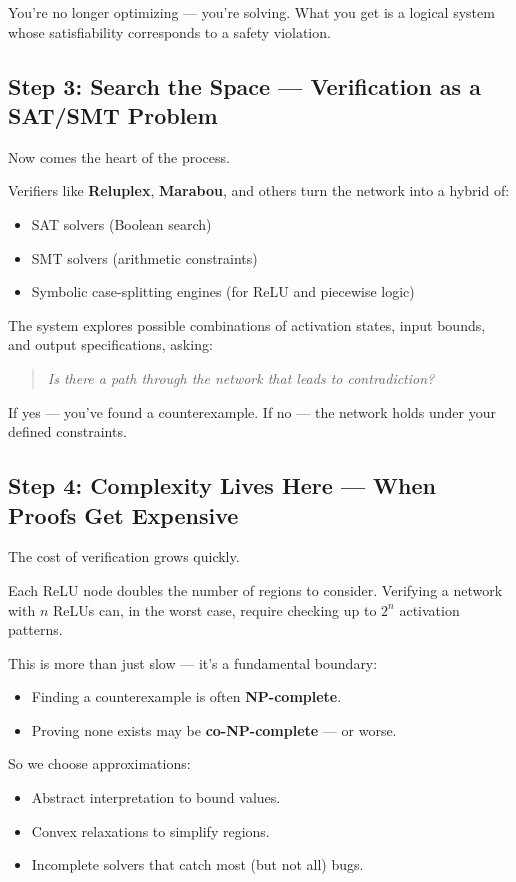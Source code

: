 You’re no longer optimizing — you’re solving.  
What you get is a logical system whose satisfiability corresponds to a safety violation.

\subsection{Step 3: Search the Space — Verification as a SAT/SMT Problem}

Now comes the heart of the process.

Verifiers like \textbf{Reluplex}, \textbf{Marabou}, and others turn the network into a hybrid of:
\begin{itemize}
  \item SAT solvers (Boolean search)
  \item SMT solvers (arithmetic constraints)
  \item Symbolic case-splitting engines (for ReLU and piecewise logic)
\end{itemize}

The system explores possible combinations of activation states, input bounds, and output specifications, asking:

\begin{quote}
\textit{Is there a path through the network that leads to contradiction?}
\end{quote}

If yes — you’ve found a counterexample.  
If no — the network holds under your defined constraints.

\subsection{Step 4: Complexity Lives Here — When Proofs Get Expensive}

The cost of verification grows quickly.

Each ReLU node doubles the number of regions to consider.  
Verifying a network with \( n \) ReLUs can, in the worst case, require checking up to \( 2^n \) activation patterns.

This is more than just slow — it’s a fundamental boundary:
\begin{itemize}
  \item Finding a counterexample is often \textbf{NP-complete}.
  \item Proving none exists may be \textbf{co-NP-complete} — or worse.
\end{itemize}

So we choose approximations:
\begin{itemize}
  \item Abstract interpretation to bound values.
  \item Convex relaxations to simplify regions.
  \item Incomplete solvers that catch most (but not all) bugs.
\end{itemize}

